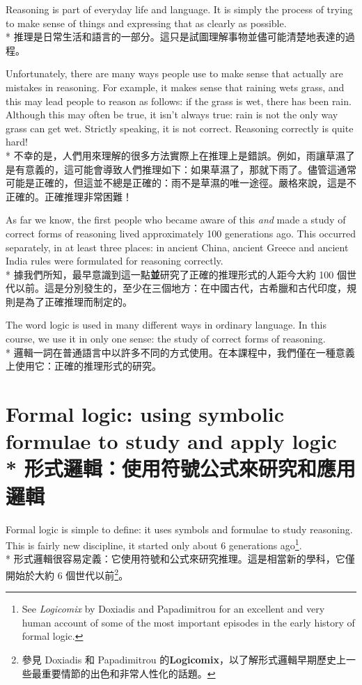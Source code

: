\documentclass[]{article}
\begin{document}
{\color{gray}Reasoning is part of everyday life and language. It is simply the process of trying to make sense of things and expressing that as clearly as possible.}
\\*
{推理是日常生活和語言的一部分。這只是試圖理解事物並儘可能清楚地表達的過程。}

{\color{gray}Unfortunately, there are many ways people use to make sense that actually are mistakes in reasoning. For example, it makes sense that raining wets grass, and this may lead people to reason as follows: if the grass is wet, there has been rain. Although this may often be true, it isn't always true: rain is not the only way grass can get wet. Strictly speaking, it is not correct. Reasoning correctly is quite hard!}
\\*
{不幸的是，人們用來理解的很多方法實際上在推理上是錯誤。例如，雨讓草濕了是有意義的，這可能會導致人們推理如下：如果草濕了，那就下雨了。儘管這通常可能是正確的，但這並不總是正確的：雨不是草濕的唯一途徑。嚴格來說，這是不正確的。正確推理非常困難！}

{\color{gray}As far we know, the first people who became aware of this \emph{and} made a study of correct forms of reasoning lived approximately 100 generations ago. This occurred separately, in at least three places: in ancient China, ancient Greece and ancient India rules were formulated for reasoning correctly.}
\\*
{據我們所知，最早意識到這一點{\bfseries{並}}研究了正確的推理形式的人距今大約 100 個世代以前。這是分別發生的，至少在三個地方：在中國古代，古希臘和古代印度，規則是為了正確推理而制定的。}

{\color{gray}The word logic is used in many different ways in ordinary language. In this course, we use it in only one sense: the study of correct forms of reasoning.}
\\*
{邏輯一詞在普通語言中以許多不同的方式使用。在本課程中，我們僅在一種意義上使用它：正確的推理形式的研究。}

\section*{{\color{gray}Formal logic: using symbolic formulae to study and apply logic}
\\*
{形式邏輯：使用符號公式來研究和應用邏輯}}

{\color{gray}Formal logic is simple to define: it uses symbols and formulae to study reasoning. This is fairly new discipline, it started only about 6 generations ago\footnote{{\color{gray}See \emph{Logicomix} by Doxiadis and Papadimitrou for an excellent and very human account of some of the most important episodes in the early history of formal logic.}}.}
\\*
{形式邏輯很容易定義：它使用符號和公式來研究推理。這是相當新的學科，它僅開始於大約 6 個世代以前\footnote{參見{ }Doxiadis{ }和{ }Papadimitrou{ }的{\bfseries{Logicomix}}，以了解形式邏輯早期歷史上一些最重要情節的出色和非常人性化的話題。}。}
\end{document}
